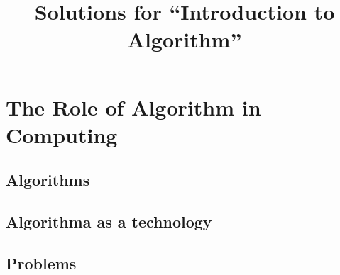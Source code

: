 \documentclass[10pt, a4paper]{article}
\begin{document}
\title{
Solutions for ``Introduction to Algorithm''
}
\newpage
\section{The Role of Algorithm in Computing}
\subsection{Algorithms}

\subsection{Algorithma as a technology}

\subsection*{Problems}

\newpage
\end{document}
